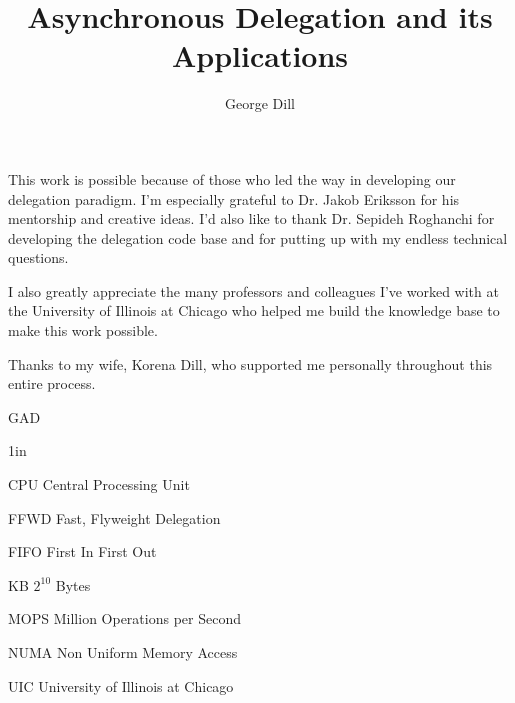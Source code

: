 \documentclass{uicthesi}
\begin{document}

\title{Asynchronous Delegation and its Applications}
\author{George Dill}
\maketitle




 \acknowledgements
{This work is possible because of those who led the way in developing our delegation paradigm. I'm especially grateful to Dr. Jakob Eriksson for his mentorship and creative ideas. I'd also like to thank Dr. Sepideh Roghanchi for developing the delegation code base and for putting up with my endless technical questions. 

I also greatly appreciate the many professors and colleagues I've worked with at the University of Illinois at Chicago who helped me build the knowledge base to make this work possible. 

Thanks to my wife, Korena Dill, who supported me personally throughout this entire process. 
\\ 

\begin{flushright}GAD\end{flushright}}


\preface


\tableofcontents
\listoftables
\listoffigures
\listofabbreviations
\begin{list}
{}
{\setlength
  {}{1in}
    \setlength{\leftmargin}{1.5in}
    \setlength{\labelsep}{.5in}
    \setlength{\rightmargin}{\leftmargin}}
\item[CPU\hfill] Central Processing Unit
\item[FFWD\hfill] Fast, Flyweight Delegation
\item[FIFO\hfill] First In First Out
\item[KB\hfill]  $2^{10}$ Bytes
\item[MOPS\hfill] Million Operations per Second
\item[NUMA\hfill] Non Uniform Memory Access
\item[UIC\hfill] University of Illinois at Chicago
\end{list}
 
\end{document}
